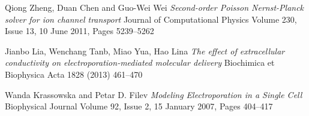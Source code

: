 \documentclass[a4paper,spanish]{article}
\begin{document}
\begin{thebibliography}{9}


	Qiong Zheng, Duan Chen and Guo-Wei Wei
	\emph{Second-order Poisson Nernst-Planck solver for ion channel transport}
	Journal of Computational Physics
	Volume 230, Issue 13, 10 June 2011, Pages 5239–5262


	Jianbo Lia, Wenchang Tanb, Miao Yua, Hao Lina
	\emph{The effect of extracellular conductivity on electroporation-mediated molecular delivery}
	Biochimica et Biophysica Acta 
	1828 (2013) 461–470
	
	Wanda Krassowska and Petar D. Filev
	\emph{Modeling Electroporation in a Single Cell}
	Biophysical Journal
	Volume 92, Issue 2, 15 January 2007, Pages 404–417

%

\end{thebibliography}
\end{document}
